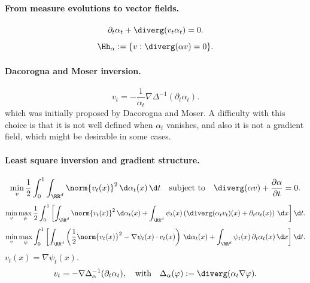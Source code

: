 \paragraph{From measure evolutions to vector fields.}
\begin{equation}
\partial_t \alpha_t + \diverg(v_t \alpha_t) = 0. \label{eq:inverse-flow}
\end{equation}
$$
\Hh_\alpha:= \{ v: \diverg( \alpha v ) = 0 \}.
$$
\paragraph{Dacorogna and Moser inversion.}
\begin{equation}\label{eq:dacorogna-moser}
v_t = - \frac{1}{\alpha_t} \nabla \Delta^{-1}(\partial_t \alpha_t).
\end{equation}
which was initially proposed by Dacorogna and Moser. A difficulty with this choice is that it is not well defined when $\alpha_t$ vanishes, and also it is not a gradient field, which might be desirable in some cases.

\paragraph{Least square inversion and gradient structure.}
\begin{equation}\label{eq:least-square-field}
\min_v \frac{1}{2}\int_0^1 \int_{\RR^d} \norm{v_t(x)}^2 \, \d\alpha_t(x) \, \d t \quad \text{subject to} \quad \diverg(\alpha v) + \frac{\partial \alpha}{\partial t} = 0.
\end{equation}
\begin{equation}
\min_v \max_{\psi} \frac{1}{2} \int_0^1 \left[ \int_{\RR^d} \norm{v_t(x)}^2 \, \d\alpha_t(x) + \int_{\RR^d} \psi_t(x)\left(\diverg(\alpha_t v_t)(x) + \partial_t \alpha_t(x)\right) \, \d x \right] \d t.
\end{equation}
\begin{equation}
\min_v \max_{\psi} \int_0^1 \left[ \int_{\RR^d} \left( \frac{1}{2} \norm{v_t(x)}^2 - \nabla \psi_t(x) \cdot v_t(x)\right) \, \d\alpha_t(x) + \int_{\RR^d} \psi_t(x) \, \partial_t \alpha_t(x) \, \d x \right] \d t.
\end{equation}
\(v_t(x) = \nabla \psi_t(x).\)
\begin{equation}\label{eq:least-square-field-explicit}
v_t = - \nabla \Delta_\alpha^{-1}(\partial_t \alpha_t), \quad \text{with} \quad \Delta_\alpha(\varphi):= \diverg(\alpha_t \nabla \varphi).
\end{equation}
